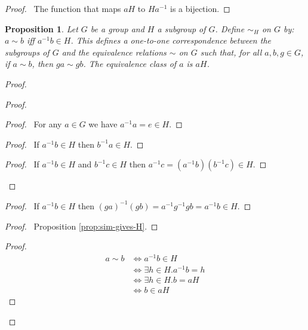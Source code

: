 \documentclass{book}
\let\qed\relax
\newtheorem{prop}{Proposition}[chapter]
\theoremstyle{definition}
\newcommand{\inv}[1]{\ensuremath{{#1}^{-1}}}
\begin{document}
\begin{proof}
\pf\ The function that maps $aH$ to $H \inv{a}$ is a bijection. \qed
\end{proof}

\begin{prop}
Let $G$ be a group and $H$ a subgroup of $G$. Define $\sim_H$ on $G$ by: $a\sim b$ iff $\inv{a} b \in H$. This defines a one-to-one correspondence between the subgroups of $G$ and the equivalence relations $\sim$ on $G$ such that, for all $a,b,g \in G$, if $a \sim b$, then $ga \sim gb$. The equivalence class of $a$ is $aH$.
\end{prop}

\begin{proof}
\pf
{}
\begin{proof}
	\begin{proof}
		\pf\ For any $a \in G$ we have $\inv{a} a = e \in H$.
	\end{proof}
	\begin{proof}
		\pf\ If $\inv{a} b \in H$ then $\inv{b} a \in H$.
	\end{proof}
	\begin{proof}
		\pf\ If $\inv{a} b \in H$ and $\inv{b} c \in H$ then $\inv{a} c = (\inv{a} b) (\inv{b} c) \in H$.
	\end{proof}
\end{proof}
\begin{proof}
	\pf\ If $\inv{a} b \in H$ then $\inv{(ga)}(gb) = \inv{a} \inv{g} g b = \inv{a} b \in H$.
\end{proof}
\begin{proof}
	\pf\ Proposition \ref{prop:sim-gives-H}.
\end{proof}
\begin{proof}
	\pf
	\begin{align*}
		a \sim b & \Leftrightarrow \inv{a} b \in H \\
		& \Leftrightarrow \exists h \in H. \inv{a} b = h \\
		& \Leftrightarrow \exists h \in H. b = aH \\
		& \Leftrightarrow b \in aH
	\end{align*}
\end{proof}
\qed
\end{proof}
\end{document}
